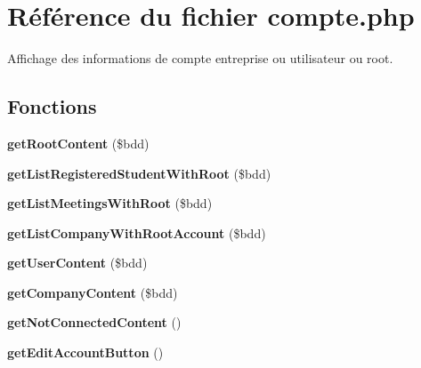 \hypertarget{compte_8php}{\section{Référence du fichier compte.\-php}
\label{compte_8php}
}


Affichage des informations de compte entreprise ou utilisateur ou root.  


\subsection*{Fonctions}
\begin{DoxyCompactItemize}
\item 
\hypertarget{compte_8php_a093efb957d6e3be19d97433ce9722079}{{\bfseries get\-Root\-Content} (\$bdd)}\label{compte_8php_a093efb957d6e3be19d97433ce9722079}

\item 
\hypertarget{compte_8php_aea6f5f0cc23336c71d72b70195fd9c00}{{\bfseries get\-List\-Registered\-Student\-With\-Root} (\$bdd)}\label{compte_8php_aea6f5f0cc23336c71d72b70195fd9c00}

\item 
\hypertarget{compte_8php_ae8f23e4ce9315fc7937248e12b8c507b}{{\bfseries get\-List\-Meetings\-With\-Root} (\$bdd)}\label{compte_8php_ae8f23e4ce9315fc7937248e12b8c507b}

\item 
\hypertarget{compte_8php_a5c99ac63f4b11e48badb80c8b0b4c060}{{\bfseries get\-List\-Company\-With\-Root\-Account} (\$bdd)}\label{compte_8php_a5c99ac63f4b11e48badb80c8b0b4c060}

\item 
\hypertarget{compte_8php_a03d4a85f4571fbe928098f70594ef41c}{{\bfseries get\-User\-Content} (\$bdd)}\label{compte_8php_a03d4a85f4571fbe928098f70594ef41c}

\item 
\hypertarget{compte_8php_ae7495dbc87a3bbf1f9ed0d432164dded}{{\bfseries get\-Company\-Content} (\$bdd)}\label{compte_8php_ae7495dbc87a3bbf1f9ed0d432164dded}

\item 
\hypertarget{compte_8php_a6864a2cabe7ba32b7dbe321b7dd63553}{{\bfseries get\-Not\-Connected\-Content} ()}\label{compte_8php_a6864a2cabe7ba32b7dbe321b7dd63553}

\item 
\hypertarget{compte_8php_a18d7f27faf8419a21fd9f5e98f5e318e}{{\bfseries get\-Edit\-Account\-Button} ()}\label{compte_8php_a18d7f27faf8419a21fd9f5e98f5e318e}

\end{DoxyCompactItemize}
